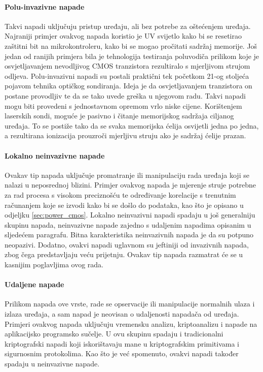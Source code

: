 \documentclass[times, utf8, diplomski]{fer}
\begin{document}
\paragraph{Polu-invazivne napade }
Takvi napadi uključuju pristup uređaju, ali bez potrebe za oštećenjem uređaja. Najraniji primjer ovakvog napada koristio je UV svijetlo kako bi se resetirao zaštitni bit na mikrokontroleru, kako bi se mogao pročitati sadržaj memorije. Još jedan od ranijih primjera bila je tehnologija testiranja poluvodiča prilikom koje je osvjetljavanjem nevodljivog CMOS tranzistora rezultiralo s mjerljivom strujom odljeva. Polu-invazivni napadi su postali praktični tek početkom 21-og stoljeća pojavom tehnika optičkog sondiranja. Ideja je da osvjetljavanjem tranzistora on postane provodljiv te da se tako uvede greška u njegovom radu. Takvi napadi mogu biti provedeni s jednostavnom opremom vrlo niske cijene. Korištenjem laserskih sondi, moguće je pasivno i čitanje memorijskog sadržaja ciljanog uređaja. To se postiže tako da se svaka memorijska ćelija osvijetli jedna po jedna, a rezultirana ionizacija prouzroči mjerljivu struju ako je sadržaj ćelije prazan.

\paragraph{Lokalno neinvazivne napade } Ovakav tip napada uključuje promatranje ili manipulaciju rada uređaja koji se nalazi u neposrednoj blizini. Primjer ovakvog napada je mjerenje struje potrebne za rad procesa s visokom preciznošću te određivanje korelacije s trenutnim računanjem koje se izvodi kako bi se došlo do podataka, kao što je opisano u odjeljku \ref{sec:power_cmos}. Lokalno neinvazivni napadi spadaju u još generalniju skupinu napada, neinvazivne napade  zajedno s udaljenim napadima opisanim u sljedećem paragrafu. Bitna karakteristika neinvazivnih napada je da su potpuno neopazivi. Dodatno, ovakvi napadi uglavnom su jeftiniji od invazivnih napada, zbog čega predstavljaju veću prijetnju. Ovakav tip napada razmatrat će se u kasnijim poglavljima ovog rada.

\paragraph{Udaljene napade } Prilikom napada ove vrste, rade se opservacije ili manipulacije normalnih ulaza i izlaza uređaja, a sam napad je neovisan o udaljenosti napadača od uređaja. Primjeri ovakvog napada uključuju vremensku analizu, kriptoanalizu i napade na aplikacijsko programsko sučelje. U ovu skupinu spadaju i tradicionalni kriptografski napadi koji iskorištavaju mane u kriptografskim primitivama i sigurnosnim protokolima. Kao što je već spomenuto, ovakvi napadi također spadaju u neinvazivne napade.
\end{document}
